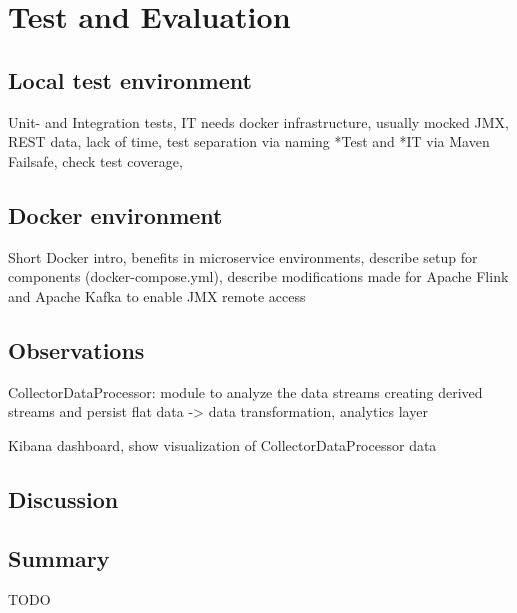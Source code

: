 \chapter{Test and Evaluation}
\label{ch:evaluation}
\section{Local test environment}

Unit- and Integration tests, IT needs docker infrastructure, usually mocked JMX, REST data,
lack of time, test separation via naming *Test and *IT via Maven Failsafe, check test coverage,

\section{Docker environment}

Short Docker intro, benefits in microservice environments, describe setup for components (docker-compose.yml),
describe modifications made for Apache Flink and Apache Kafka to enable JMX remote access

\section{Observations}

CollectorDataProcessor: module to analyze the data streams creating derived streams and persist flat
data -> data transformation, analytics layer

Kibana dashboard, show visualization of CollectorDataProcessor data

\section{Discussion}


\section{Summary}

TODO

